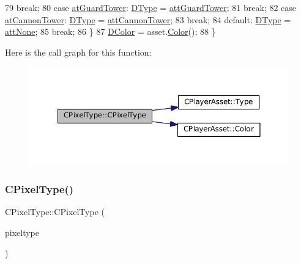 \begin{DoxyCode}
79                                 \textcolor{keywordflow}{break};
80         \textcolor{keywordflow}{case} \hyperlink{GameDataTypes_8h_a5600d4fc433b83300308921974477feca65fa6c84ff93972a623793d4ee72d87f}{atGuardTower}:      \hyperlink{classCPixelType_aca37f042b510a349e0d3209c73ae51c5}{DType} = \hyperlink{classCPixelType_af06457fd1c2ff34c67ce670e633a10b0ab5afa80bf72a1e1fd366490591794229}{attGuardTower};
81                                 \textcolor{keywordflow}{break};
82         \textcolor{keywordflow}{case} \hyperlink{GameDataTypes_8h_a5600d4fc433b83300308921974477feca226f6f1968ce76c97cdabb780a6c289d}{atCannonTower}:     \hyperlink{classCPixelType_aca37f042b510a349e0d3209c73ae51c5}{DType} = \hyperlink{classCPixelType_af06457fd1c2ff34c67ce670e633a10b0a9220629e324fc6cfb6eb9e0f9853354c}{attCannonTower};
83                                 \textcolor{keywordflow}{break};
84         \textcolor{keywordflow}{default}:                \hyperlink{classCPixelType_aca37f042b510a349e0d3209c73ae51c5}{DType} = \hyperlink{classCPixelType_af06457fd1c2ff34c67ce670e633a10b0a19050fdb98082f54b7a4e9365912763b}{attNone};
85                                 \textcolor{keywordflow}{break};
86     \}
87     \hyperlink{classCPixelType_a474243cf748aee94cfa207659e940b6c}{DColor} = asset.\hyperlink{classCPlayerAsset_a969e6e60c6343186d2b9a6cddd6654f8}{Color}();
88 \}
\end{DoxyCode}
Here is the call graph for this function\+:
\nopagebreak
\begin{figure}[H]
\begin{center}
\leavevmode
\includegraphics[width=350pt]{classCPixelType_abf05fa378b6e924c40d3616d6c718557_cgraph}
\end{center}
\end{figure}
\hypertarget{classCPixelType_a393a54c12c99809690961764f8f002fe}{}\label{classCPixelType_a393a54c12c99809690961764f8f002fe} 
\subsubsection{\texorpdfstring{C\+Pixel\+Type()}{CPixelType()}\hspace{0.1cm}{\footnotesize\ttfamily [4/4]}}
{\footnotesize\ttfamily C\+Pixel\+Type\+::\+C\+Pixel\+Type (\begin{DoxyParamCaption}\item[{const \hyperlink{classCPixelType}{C\+Pixel\+Type} \&}]{pixeltype }\end{DoxyParamCaption})}




